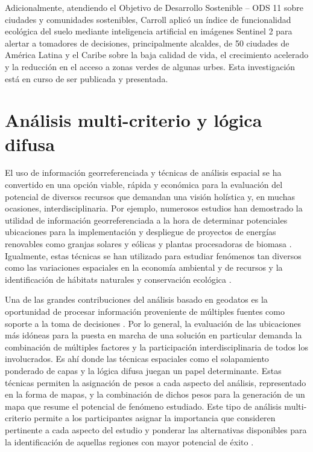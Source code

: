 Adicionalmente, atendiendo el Objetivo de Desarrollo Sostenible – ODS 11 sobre ciudades y comunidades sostenibles, Carroll aplicó un índice de funcionalidad
ecológica del suelo mediante inteligencia artificial en imágenes Sentinel 2 para alertar a tomadores de decisiones, principalmente alcaldes, de 50 ciudades de 
América Latina y el Caribe sobre la baja calidad de vida, el crecimiento acelerado y la reducción en el acceso a zonas verdes de algunas urbes. Esta 
investigación está en curso de ser publicada y presentada.

\section{Análisis multi-criterio y lógica difusa}
El uso de información georreferenciada y técnicas de análisis espacial se ha convertido en una opción viable, rápida y económica para la evaluación del 
potencial de diversos recursos que demandan una visión holística y, en muchas ocasiones, interdisciplinaria.  Por ejemplo, numerosos estudios han demostrado la 
utilidad de información georreferenciada a la hora de determinar potenciales ubicaciones para la implementación y despliegue de proyectos de energías renovables 
como granjas solares y eólicas y plantas procesadoras de biomasa \cite{cabrera_landsat_2016, aydin_gis-based_2010, lourenco_biomass_2021}.  Igualmente, estas 
técnicas se han utilizado para estudiar fenómenos tan diversos como las variaciones espaciales en la economía ambiental y de recursos y la identificación de 
hábitats naturales y conservación ecológica \cite{bateman_applying_2002, gough_application_2000}.

Una de las grandes contribuciones del análisis basado en geodatos es la oportunidad de procesar información proveniente de múltiples 
fuentes como soporte a la toma de decisiones \cite{rikalovic_gis_2014, hansen_gis-based_2005}.  Por lo general, la evaluación de las ubicaciones más idóneas 
para la puesta en marcha de una solución en particular demanda la combinación de múltiples factores y la participación interdisciplinaria de todos los 
involucrados. Es ahí donde las técnicas espaciales como el  solapamiento ponderado de capas y la lógica difusa juegan un papel determinante.  Estas técnicas 
permiten la asignación de pesos a cada aspecto del análisis, representado en la forma de mapas, y la combinación de dichos pesos para la generación de un mapa 
que resume el potencial de fenómeno estudiado.  Este tipo de análisis multi-criterio permite a los participantes asignar la importancia que consideren 
pertinente a cada aspecto del estudio y ponderar las alternativas disponibles para la identificación de aquellas regiones con mayor potencial de éxito 
\cite{malczewski_gisbased_2006}.

